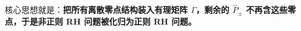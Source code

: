 \documentclass[
    lang=cn,
    scheme=chinese,
    mode=simple,
    device=normal,
    color=blue,
    math=cm,
    thmcnt=section,
    12pt,
    nowatermark
]{elegantbook}
\begin{document}
核心思想就是：\textbf{把所有离散零点结构装入有理矩阵 $\Gamma$，剩余的 $\widehat P_\pm$ 不再含这些零点，于是非正则 RH 问题被化归为正则 RH 问题。}








\end{document}
